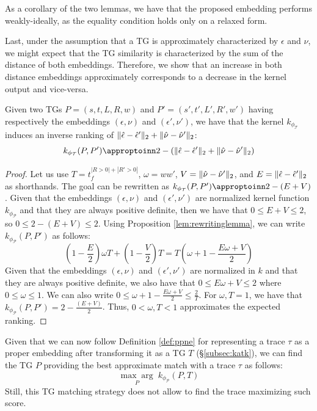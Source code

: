 As a corollary of the two lemmas, we have that the proposed embedding performs weakly-ideally, as the equality condition holds only on a relaxed form.

Last, under the assumption that a TG is approximately characterized by $\epsilon$ and $\nu$, we might expect that the TG similarity is characterized by the sum of the distance of both embeddings. Therefore, we show that an increase in both distance embeddings approximately corresponds to a decrease in the kernel output and vice-versa.

\begin{lemma}\label{lem:approxRank}
Given two TGs $P=(s,t,L,R,w)$ and $P'=(s',t',L',R',w')$ having respectively the embeddings $(\epsilon,\nu)$ and $(\epsilon',\nu')$, we have that the kernel $k_{\phi_{\mathcal{T}}}$ induces an inverse ranking of $\|\hat{\epsilon}-\hat{\epsilon}'\|_{2}+\|\hat{\nu}-\hat{\nu}'\|_{2}$:
$$k_{\phi_{\mathcal{T}}}(P,P')\appropto 2-(\norm{\hat{\epsilon}-\hat{\epsilon}'}{2}+\norm{\hat{\nu}-\hat{\nu}'}{2})$$
\end{lemma}
\begin{proof}
Let us use $T=t_f^{|R>0|+|R'>0|}$, $\omega=ww'$, $V=\|\hat{\nu}-\hat{\nu}'\|_{2}$, and $E=\|\hat{\epsilon}-\hat{\epsilon}'\|_{2}$ as shorthands. The goal can be rewritten as $k_{\phi_{\mathcal{T}}}(P,P')\appropto 2-(E+V)$. Given that the embeddings $(\epsilon,\nu)$ and $(\epsilon',\nu')$ are normalized kernel function $k_{\phi_{\mathcal{P}}}$ and that they are always positive definite, then we have that $0\leq E +V\leq 2$, so $0\leq 2-(E+V)\leq 2$. Using Proposition \ref{lem:rewritinglemma}, we can write $k_{\phi_{\mathcal{P}}}(P,P')$ as follows:
$$\left(1-\frac{E}{2}\right)\omega T+\left(1-\frac{V}{2}\right)T=T\left(\omega+1-\frac{E\omega+V}{2}\right)$$
Given that the embeddings $(\epsilon,\nu)$ and $(\epsilon',\nu')$ are normalized in $k$ and that they are always positive definite,  we also have that $0\leq E\omega +V\leq 2$ where $0\leq \omega\leq 1$. We can also write  $0\leq \omega+1-\frac{E\omega+V}{2}\leq \frac{2}{T}$. For $\omega,T=1$, we have that $k_{\phi_{\mathcal{P}}}(P,P')=2-\frac{(E+V)}{2}$. Thus, $0<\omega,T<1$ approximates the expected ranking. 
\end{proof}

Given that we can now follow Definition \ref{def:ppne} for representing a trace $\tau$ as a proper embedding after transforming it as a TG $T$ (\S\ref{subsec:katk}), we can find the TG $P$ providing the best approximate match with  a trace $\tau$ as follows:
\[\underset{{P}}{\max\arg}\;k_{\phi_{\mathcal{P}}}(P,T)\]
Still, this TG matching strategy does not allow to find the trace maximizing such score. %


